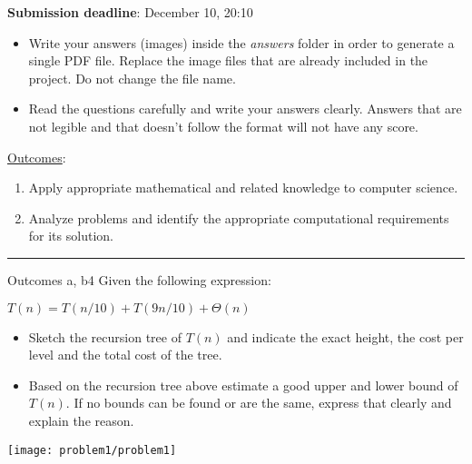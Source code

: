 



\textbf{Submission deadline}: December 10, 20:10\\ 

\begin{itemize}
    \item Write your answers (images) inside the \emph{answers} folder in order to generate a single PDF file. Replace the image files that are already included in the project. Do not change the file name.
    \item Read the questions carefully and write your answers clearly. Answers that are not legible and that doesn't follow the format will not have any score. 
\end{itemize}

\underline{Outcomes}:

\begin{enumerate}[label=\alph*.]
    \item Apply appropriate mathematical and related knowledge to computer science.
    \item Analyze problems and identify the appropriate computational requirements for its solution.
\end{enumerate}
\noindent\rule{\textwidth}{0.01pt}
\vspace{3mm}

\begin{problem}{Outcomes a, b}{4}
    Given the following expression:
    \begin{center}
        $T(n) = T(n/10) + T(9n/10) + \Theta(n)$
    \end{center}
    \begin{itemize}
        \item Sketch the recursion tree of $T(n)$ and indicate the exact height, the cost per level and the total cost of the tree.
        \item Based on the recursion tree above estimate a good upper and lower bound of $T(n)$. If no bounds can be found or are the same, express that clearly and explain the reason.
    \end{itemize}

    \begin{center}
        \texttt{[image: problem1/problem1]}%
    \end{center}
\end{problem}

